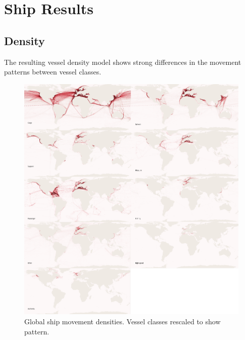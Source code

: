 
\section{Ship Results}

\subsection{Density}

The resulting vessel density model shows strong differences in the movement patterns between vessel classes. 

\begin{figure}[htbp!]
  \centering
  \hspace*{-0.3in}
    \includegraphics[width=160mm]{figures/9fold-map-labeled-2x5.pdf}
  \caption[Ship movement densities]{Global ship movement densities. Vessel classes rescaled to show pattern.}
  \label{fig:9fold-ship-maps}
\end{figure}

